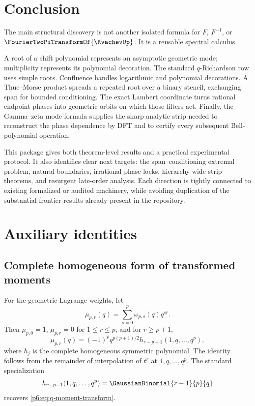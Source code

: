 \documentclass[11pt]{article}
\numberwithin{equation}{section}
\theoremstyle{definition}
\theoremstyle{remark}
\begin{document}
\section{Conclusion}

The main structural discovery is not another isolated formula for $F$, $F^{-1}$, or
$\FourierTwoPiTransformOf{\RvachevUp}$.  It is a reusable spectral calculus.

A root of a shift polynomial represents an asymptotic geometric mode; multiplicity
represents its polynomial decoration.  The standard $q$-Richardson row uses simple roots.
Confluence handles logarithmic and polynomial decorations.  A Thue--Morse product spreads a
repeated root over a binary stencil, exchanging span for bounded conditioning.  The exact
Lambert coordinate turns rational endpoint phases into geometric orbits on which those
filters act.  Finally, the Gamma--zeta mode formula supplies the sharp analytic strip needed
to reconstruct the phase dependence by DFT and to certify every subsequent Bell-polynomial
operation.

This package gives both theorem-level results and a practical experimental protocol.  It
also identifies clear next targets: the span--conditioning extremal problem, natural
boundaries, irrational phase locks, hierarchy-wide strip theorems, and resurgent late-order
analysis.  Each direction is tightly connected to existing formalized or audited machinery,
while avoiding duplication of the substantial frontier results already present in the
repository.

\appendix
\renewcommand*{\theHsection}{\arabic{part}.\arabic{section}}

\section{Auxiliary identities}
\label{p6:app:identities}

\subsection{Complete homogeneous form of transformed moments}

For the geometric Lagrange weights, let
\[
 \mu_{p,r}(q)=\sum_{s=0}^{p}\omega_{p,s}(q)q^{sr}.
\]
Then $\mu_{p,0}=1$, $\mu_{p,r}=0$ for $1\le r\le p$, and for $r\ge p+1$,
\begin{equation}
 \mu_{p,r}(q)
 =(-1)^pq^{p(p+1)/2}
 h_{r-p-1}(1,q,\ldots,q^p),
 \label{p6:eq:complete-homogeneous-moment}
\end{equation}
where $h_j$ is the complete homogeneous symmetric polynomial.  The identity follows from
the remainder of interpolation of $t^r$ at $1,q,\ldots,q^p$.  The standard specialization
\[
 h_{r-p-1}(1,q,\ldots,q^p)=\GaussianBinomial{r-1}{p}{q}
\]
recovers \eqref{p6:eq:q-moment-transform}.
\end{document}

